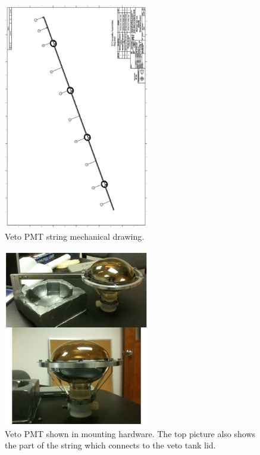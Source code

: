 \documentclass[preprint,12pt]{elsarticle}
\begin{document}
\begin{figure}[h]
\begin{center}
\includegraphics[width=2.5in,angle=270]{graphics/vetopmtstring.pdf}
\caption{Veto PMT string mechanical drawing.
\label{fig:vetopmtstring}}
\end{center}
\end{figure}

\begin{figure}[h]
\begin{center}
\includegraphics[width=2.5in]{graphics/vetopmtmountpic.pdf}
\caption{Veto PMT shown in mounting hardware.  The top picture also shows the part of the string which connects to the veto tank lid.
\label{fig:vetopmtmountpic}}
\end{center}
\end{figure}
\end{document}
